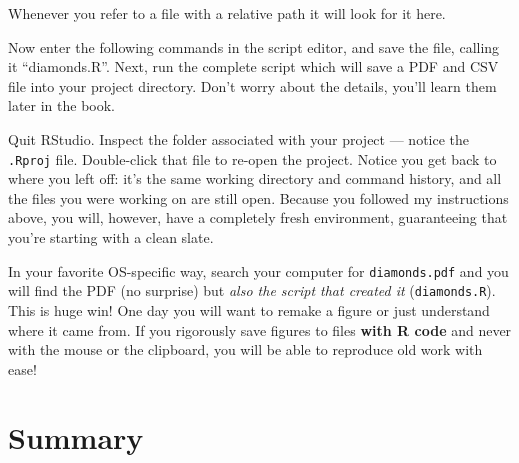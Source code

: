 \documentclass[letterpaper,12pt,twoside,]{pinp}
\begin{document}
\begin{Shaded}
\begin{Highlighting}[]
\NormalTok{()}
\end{Highlighting}
\end{Shaded}

Whenever you refer to a file with a relative path it will look for it
here.

Now enter the following commands in the script editor, and save the
file, calling it ``diamonds.R''. Next, run the complete script which
will save a PDF and CSV file into your project directory. Don't worry
about the details, you'll learn them later in the book.

\begin{Shaded}
\begin{Highlighting}[]

\OperatorTok{+}\StringTok{ }
\StringTok{  }\NormalTok{()}
\NormalTok{(}\NormalTok{)}

\NormalTok{)}
\end{Highlighting}
\end{Shaded}

Quit RStudio. Inspect the folder associated with your project --- notice
the \texttt{.Rproj} file. Double-click that file to re-open the project.
Notice you get back to where you left off: it's the same working
directory and command history, and all the files you were working on are
still open. Because you followed my instructions above, you will,
however, have a completely fresh environment, guaranteeing that you're
starting with a clean slate.

In your favorite OS-specific way, search your computer for
\texttt{diamonds.pdf} and you will find the PDF (no surprise) but
\emph{also the script that created it} (\texttt{diamonds.R}). This is
huge win! One day you will want to remake a figure or just understand
where it came from. If you rigorously save figures to files \textbf{with
R code} and never with the mouse or the clipboard, you will be able to
reproduce old work with ease!

\hypertarget{summary}{%
\section{Summary}\label{summary}}
\end{document}
